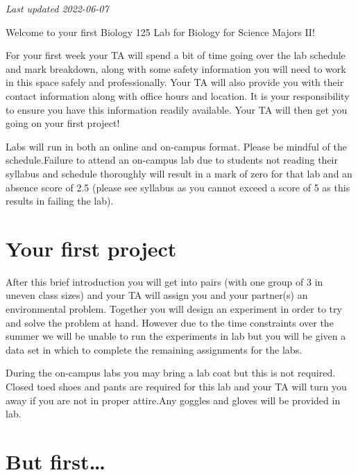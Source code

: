 \documentclass[
]{book}
\begin{document}
\emph{Last updated 2022-06-07}

Welcome to your first Biology 125 Lab for Biology for Science Majors II!

For your first week your TA will spend a bit of time going over the lab schedule and mark breakdown, along with some safety information you will need to work in this space safely and professionally. Your TA will also provide you with their contact information along with office hours and location. It is your responsibility to ensure you have this information readily available. Your TA will then get you going on your first project!

Labs will run in both an online and on-campus format. Please be mindful of the schedule.Failure to attend an on-campus lab due to students not reading their syllabus and schedule thoroughly will result in a mark of zero for that lab and an absence score of 2.5 (please see syllabus as you cannot exceed a score of 5 as this results in failing the lab).

\hypertarget{your-first-project}{%
\section*{Your first project}\label{your-first-project}}

After this brief introduction you will get into pairs (with one group of 3 in uneven class sizes) and your TA will assign you and your partner(s) an environmental problem. Together you will design an experiment in order to try and solve the problem at hand. However due to the time constraints over the summer we will be unable to run the experiments in lab but you will be given a data set in which to complete the remaining assignments for the labs.

During the on-campus labs you may bring a lab coat but this is not required. Closed toed shoes and pants are required for this lab and your TA will turn you away if you are not in proper attire.Any goggles and gloves will be provided in lab.

\hypertarget{but-first}{%
\section*{But first\ldots{}}\label{but-first}}
\end{document}
